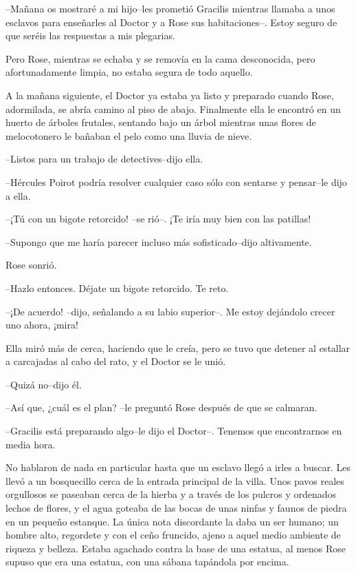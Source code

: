 --Mañana os mostraré a mi hijo--les prometió Gracilis mientras llamaba a
unos esclavos para enseñarles al Doctor y a Rose sus habitaciones--.
Estoy seguro de que seréis las respuestas a mis plegarias.

Pero Rose, mientras se echaba y se removía en la cama desconocida, pero
afortunadamente limpia, no estaba segura de todo aquello.

A la mañana siguiente, el Doctor ya estaba ya listo y preparado cuando
Rose, adormilada, se abría camino al piso de abajo. Finalmente ella le
encontró en un huerto de árboles frutales, sentando bajo un árbol
mientras unas flores de melocotonero le bañaban el pelo como una lluvia
de nieve.

--Listos para un trabajo de detectives--dijo ella.

--Hércules Poirot podría resolver cualquier caso sólo con sentarse y
pensar--le dijo a ella.

--¡Tú con un bigote retorcido! --se rió--. ¡Te iría muy bien con las
patillas!

--Supongo que me haría parecer incluso más sofisticado--dijo
altivamente.

Rose sonrió.

--Hazlo entonces. Déjate un bigote retorcido. Te reto.

--¡De acuerdo! --dijo, señalando a su labio superior--. Me estoy
dejándolo crecer uno ahora, ¡mira!

Ella miró más de cerca, haciendo que le creía, pero se tuvo que detener
al estallar a carcajadas al cabo del rato, y el Doctor se le unió.

--Quizá no--dijo él.

--Así que, ¿cuál es el plan? --le preguntó Rose después de que se
calmaran.

--Gracilis está preparando algo--le dijo el Doctor--. Tenemos que
encontrarnos en media hora.

No hablaron de nada en particular hasta que un esclavo llegó a irles a
buscar. Les llevó a un bosquecillo cerca de la entrada principal de la
villa. Unos pavos reales orgullosos se paseaban cerca de la hierba y a
través de los pulcros y ordenados lechos de flores, y el agua goteaba de
las bocas de unas ninfas y faunos de piedra en un pequeño estanque. La
única nota discordante la daba un ser humano; un hombre alto, regordete
y con el ceño fruncido, ajeno a aquel medio ambiente de riqueza y
belleza. Estaba agachado contra la base de una estatua, al menos Rose
supuso que era una estatua, con una sábana tapándola por encima.

